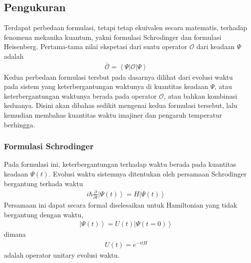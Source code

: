 \chapter{\babDua}

\section{Pengukuran}
Terdapat perbedaan formulasi\cite{fetter}, tetapi tetap ekuivalen secara matematis, terhadap fenomena mekanika kuantum, yakni formulasi Schrodinger dan formulasi Heisenberg. Pertama-tama nilai ekspetasi dari suatu operator $\mathcal{O}$ dari keadaan $\Psi$ adalah
\begin{align}
\bar{\mathcal{O}} = \left\langle \Psi | \mathcal{O} | \Psi \right\rangle
\end{align}
Kedua perbedaan formulasi tersbut pada dasarnya dilihat dari evolusi waktu pada sistem yang keterbergantungan waktunya di kuantitas keadaan $\Psi$, atau keterbergantungan waktunya berada pada operator $\mathcal{O}$, atau bahkan kombinasi keduanya. Disini akan dibahas sedikit mengenai kedua formulasi tersebut, lalu kemudian membahas kuantitas waktu imajiner dan pengaruh temperatur berhingga.

\subsection{Formulasi Schrodinger}
Pada formulasi ini, keterbergantungan terhadap waktu berada pada kuantitas keadaan $\Psi(t)$. Evolusi waktu sistemnya ditentukan oleh persamaan Schrodinger bergantung terhada waktu
\begin{align}
i\hbar \frac{\partial}{\partial t} \left\vert \Psi(t) \right\rangle = H\left\vert \Psi(t) \right\rangle
\end{align}
Persamaan ini dapat secara formal diselesaikan untuk Hamiltonian yang tidak bergantung dengan waktu,
\begin{align}
\left\vert \Psi(t) \right\rangle = U(t) \left\vert \Psi(t = 0) \right\rangle
\end{align}
dimana
\begin{align}
U(t) = e^{-itH}
\end{align}
adalah operator unitary evolusi waktu.

